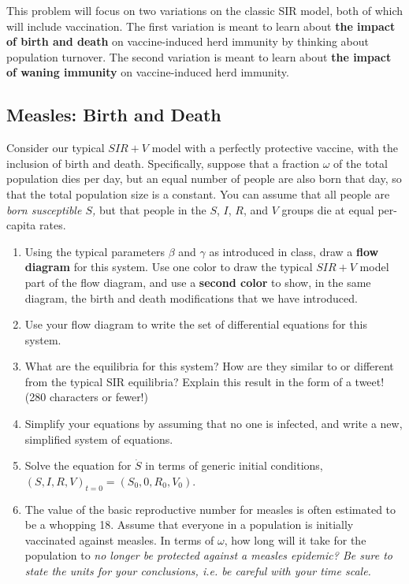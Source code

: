 \documentclass[11pt,onecolumn,superscriptaddress,notitlepage]{article}
\begin{document}
This problem will focus on two variations on the classic SIR model, both of which will include vaccination. The first variation is meant to learn about {\bf the impact of birth and death} on vaccine-induced herd immunity by thinking about population turnover. The second variation is meant to learn about {\bf the impact of waning immunity} on vaccine-induced herd immunity.

\subsection*{Measles: Birth and Death}

Consider our typical $SIR+V$ model with a perfectly protective vaccine, with the inclusion of birth and death. Specifically, suppose that a fraction $\omega$ of the total population dies per day, but an equal number of people are also born that day, so that the total population size is a constant. You can assume that all people are {\it born susceptible $S$,} but that people in the $S$, $I$, $R$, and $V$ groups die at equal per-capita rates.

\begin{enumerate}[resume]
	\item Using the typical parameters $\beta$ and $\gamma$ as introduced in class, draw a {\bf flow diagram} for this system. Use one color to draw the typical $SIR+V$ model part of the flow diagram, and use a {\bf second color} to show, in the same diagram, the birth and death modifications that we have introduced.
	\item Use your flow diagram to write the set of differential equations for this system.
	\item What are the equilibria for this system? How are they similar to or different from the typical SIR equilibria? Explain this result in the form of a tweet! (280 characters or fewer!)
	\item Simplify your equations by assuming that no one is infected, and write a new, simplified system of equations. 
	\item Solve the equation for $\dot{S}$ in terms of generic initial conditions, $ (S,I,R,V)_{t=0} = (S_0, 0, R_0, V_0)$. 
	\item The value of the basic reproductive number for measles is often estimated to be a whopping 18. Assume that everyone in a population is initially vaccinated against measles. In terms of $\omega$, how long will it take for the population to {\it no longer be protected against a measles epidemic? Be sure to state the units for your conclusions, i.e. be careful with your time scale.}
\end{enumerate}
\end{document}

